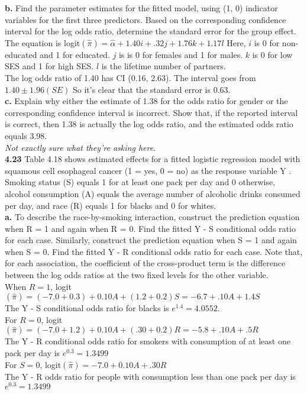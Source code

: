 \documentclass[paper=letter, fontsize=11pt]{scrartcl} %
\begin{document}
\textbf{b.} Find the parameter estimates for the fitted model, using (1, 0) indicator
variables for the first three predictors. Based on the corresponding confidence
interval for the log odds ratio, determine the standard error for the
group effect. \\
The equation is logit$(\hat{\pi}) = \hat{\alpha} + 1.40i + .32j + 1.76k + 1.17l$
Here, $i$ is 0 for non-educated and 1 for educated. $j$ is is 0 for females and 1 for
males. $k$ is 0 for low SES and 1 for high SES. $l$ is the lifetime number of partners.
\\
The log odds ratio of 1.40 has CI (0.16, 2.63). The interval goes from $1.40 \pm 1.96(SE)$
So it's clear that the standard error is 0.63.
\\

\textbf{c.} Explain why either the estimate of 1.38 for the odds ratio for gender or the
corresponding confidence interval is incorrect. Show that, if the reported
interval is correct, then 1.38 is actually the log odds ratio, and the estimated
odds ratio equals 3.98. \\
\textit{Not exactly sure what they're asking here.}
\\

\textbf{4.23} Table 4.18 shows estimated effects for a fitted logistic regression model 
with squamous cell esophageal cancer (1 = yes, 0 = no) as the response variable
Y . Smoking status (S) equals 1 for at least one pack per day and 0 otherwise,
alcohol consumption (A) equals the average number of alcoholic drinks
consumed per day, and race (R) equals 1 for blacks and 0 for whites. \\

\textbf{a.} To describe the race-by-smoking interaction, construct the prediction 
equation when R = 1 and again when R = 0. Find the fitted Y - S conditional odds
ratio for each case. Similarly, construct the prediction equation when S = 1
and again when S = 0. Find the fitted Y - R conditional odds ratio for each
case. Note that, for each association, the coefficient of the cross-product
term is the difference between the log odds ratios at the two fixed levels for
the other variable. \\

When $R = 1$, logit$(\hat{\pi}) = (-7.0 + 0.3) + 0.10A + (1.2 + 0.2)S = -6.7 + .10A + 1.4S$
\\
The Y - S conditional odds ratio for blacks is $e^{1.4} = 4.0552$. 
\\
For $R = 0$, logit$(\hat{\pi}) = (-7.0 + 1.2) + 0.10A + (.30 + 0.2)R = -5.8 + .10A + .5R$
\\
The Y - R conditional odds ratio for smokers with consumption of at least one pack per day
is $e^{0.3} = 1.3499$
\\
For $S = 0$, logit$(\hat{\pi}) = -7.0 + 0.10A + .30R$
\\
The Y - R odds ratio for people with consumption less than one pack per day is
$e^{0.3} = 1.3499$
\\
\end{document}
